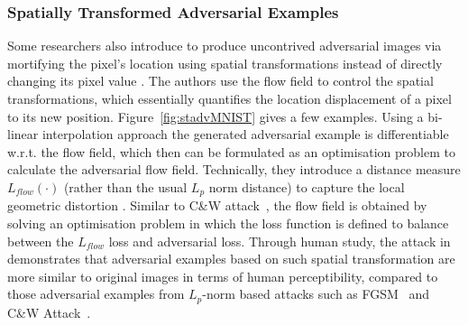 \subsubsection{Spatially Transformed Adversarial Examples}

Some researchers also
introduce
to produce uncontrived adversarial images via mortifying the pixel's location using spatial transformations instead of directly changing its pixel value \cite{xiao2018spatially}. The authors use the flow field to control the spatial transformations, which essentially quantifies the location displacement of a pixel to its new position. Figure~\ref{fig:stadvMNIST} gives a few examples. Using a bi-linear interpolation approach the generated adversarial example is differentiable w.r.t. the flow field, which then can be formulated as an optimisation problem to calculate the adversarial flow field.
Technically, they introduce a distance measure $L_{flow}(\cdot)$ (rather than the usual $L_p$ norm distance) to capture the local geometric distortion \cite{xiao2018spatially}. Similar to C\&W attack~\cite{CW2016}, the flow field is obtained by solving an optimisation problem in which the loss function is defined to balance between the $L_{flow}$ loss and adversarial loss.
Through human study, the attack in \cite{xiao2018spatially} demonstrates that adversarial examples based on such spatial transformation are more similar to original images in terms of human perceptibility, compared to those adversarial examples from $L_p$-norm based attacks such as FGSM~\cite{DBLP:journals/corr/GoodfellowSS14} and C\&W Attack~\cite{CW2016}.


